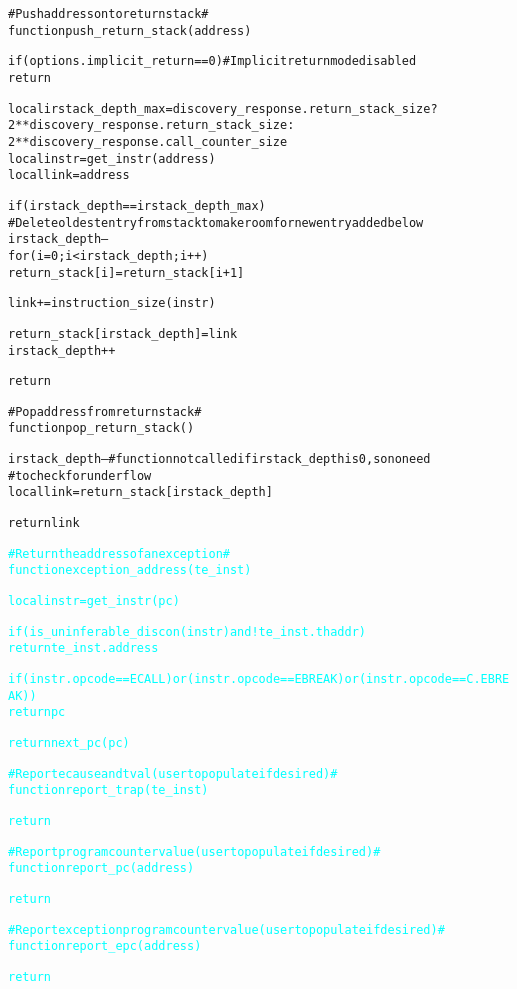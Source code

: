 \begin{alltt}
# Push address onto return stack #
function push_return_stack (address)

  if (options.implicit_return == 0) # Implicit return mode disabled
    return

  local irstack_depth_max = discovery_response.return_stack_size ?
                             2**discovery_response.return_stack_size :
                             2**discovery_response.call_counter_size
  local instr             = get_instr(address)
  local link              = address

  if (irstack_depth == irstack_depth_max)
    # Delete oldest entry from stack to make room for new entry added below
    irstack_depth--
    for (i = 0; i < irstack_depth; i++)
      return_stack[i] = return_stack[i+1]

  link += instruction_size(instr)

  return_stack[irstack_depth] = link
  irstack_depth++

  return

# Pop address from return stack #
function pop_return_stack ()

  irstack_depth-- # function not called if irstack_depth is 0, so no need
                  #  to check for underflow
  local  link = return_stack[irstack_depth]

  return link

\textcolor{cyan}{# Return the address of an exception #}
\textcolor{cyan}{function exception_address(te_inst)}

\textcolor{cyan}{  local instr = get_instr(pc)}

\textcolor{cyan}{  if (is_uninferable_discon(instr) and !te_inst.thaddr)}
\textcolor{cyan}{    return te_inst.address}

\textcolor{cyan}{  if (instr.opcode == ECALL) or (instr.opcode == EBREAK) or (instr.opcode == C.EBREAK))}
\textcolor{cyan}{    return pc}

\textcolor{cyan}{  return next_pc(pc)}
\end{alltt}

\pagebreak

\begin{alltt}
\textcolor{cyan}{# Report ecause and tval (user to populate if desired) #}
\textcolor{cyan}{function report_trap(te_inst)}

\textcolor{cyan}{  return}
  
\textcolor{cyan}{# Report program counter value (user to populate if desired) #}
\textcolor{cyan}{function report_pc(address)}

\textcolor{cyan}{  return}
  
\textcolor{cyan}{# Report exception program counter value (user to populate if desired) #}
\textcolor{cyan}{function report_epc(address)}

\textcolor{cyan}{  return}
  
\end{alltt}
